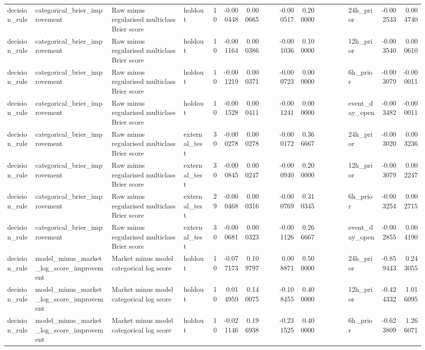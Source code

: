 \begin{tabular}{llllrrrrrrrlrrllrr}
decision\_rule & categorical\_brier\_improvement & Raw minus regularised multiclass Brier score & holdout & 10 & -0.000448 & 0.000665 &  &  & -0.000517 & 0.200000 &  &  &  &  & 24h\_prior & -0.002533 & 0.004740 \\
decision\_rule & categorical\_brier\_improvement & Raw minus regularised multiclass Brier score & holdout & 10 & -0.001164 & 0.000386 &  &  & -0.001036 & 0.100000 &  &  &  &  & 12h\_prior & -0.003540 & 0.000610 \\
decision\_rule & categorical\_brier\_improvement & Raw minus regularised multiclass Brier score & holdout & 10 & -0.001219 & 0.000371 &  &  & -0.000723 & 0.000000 &  &  &  &  & 6h\_prior & -0.003079 & -0.000011 \\
decision\_rule & categorical\_brier\_improvement & Raw minus regularised multiclass Brier score & holdout & 10 & -0.001528 & 0.000411 &  &  & -0.001241 & 0.000000 &  &  &  &  & event\_day\_open & -0.003482 & -0.000011 \\
decision\_rule & categorical\_brier\_improvement & Raw minus regularised multiclass Brier score & external\_test & 30 & -0.000278 & 0.000278 &  &  & -0.000172 & 0.366667 &  &  &  &  & 24h\_prior & -0.003020 & 0.003236 \\
decision\_rule & categorical\_brier\_improvement & Raw minus regularised multiclass Brier score & external\_test & 30 & -0.000845 & 0.000247 &  &  & -0.000940 & 0.200000 &  &  &  &  & 12h\_prior & -0.003079 & 0.002247 \\
decision\_rule & categorical\_brier\_improvement & Raw minus regularised multiclass Brier score & external\_test & 29 & -0.000468 & 0.000316 &  &  & -0.000769 & 0.310345 &  &  &  &  & 6h\_prior & -0.003254 & 0.002715 \\
decision\_rule & categorical\_brier\_improvement & Raw minus regularised multiclass Brier score & external\_test & 30 & -0.000681 & 0.000323 &  &  & -0.001126 & 0.266667 &  &  &  &  & event\_day\_open & -0.002855 & 0.004190 \\
decision\_rule & model\_minus\_market\_log\_score\_improvement & Market minus model categorical log score & holdout & 10 & -0.077173 & 0.109797 &  &  & 0.008871 & 0.500000 &  &  &  &  & 24h\_prior & -0.859443 & 0.243055 \\
decision\_rule & model\_minus\_market\_log\_score\_improvement & Market minus model categorical log score & holdout & 10 & 0.014959 & 0.140075 &  &  & -0.108455 & 0.400000 &  &  &  &  & 12h\_prior & -0.424332 & 1.016095 \\
decision\_rule & model\_minus\_market\_log\_score\_improvement & Market minus model categorical log score & holdout & 10 & -0.021146 & 0.196938 &  &  & -0.231525 & 0.400000 &  &  &  &  & 6h\_prior & -0.623809 & 1.266071 \\

\end{tabular}
